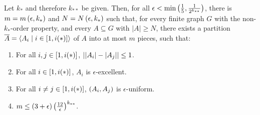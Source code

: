     \theorem[Theorem 5.18]\label{minimal_conditions_for_excellent_partitions}
        Let $k_*$ and therefore $k_{**}$ be given.
        Then, for all $\epsilon < \min \left( \frac{1}{5}, \frac{1}{2^{k_{**}}} \right)$, there is $m = m\left( \epsilon, k_* \right)$
        and $N = N\left( \epsilon, k_* \right)$ such that, for every finite graph $G$ with the non-$k_{*}$-order property, and
        every $A \subseteq G$ with $|A| \geq N$, there exists a partition $\overline{A} = \left< A_i \mid i \in \left[ 1, i(*) \right] \right>$
        of $A$ into at most $m$ pieces, such that:
        \begin{enumerate}
            \item \label{itm:5.18.1} For all $i, j \in \left[ 1, i(*) \right]$, $\left| \left| A_i \right|- \left| A_j \right| \right| \leq 1$.
            \item \label{itm:5.18.2} For all $i \in \left[ 1, i(*) \right]$, $A_i$ is $\epsilon$-excellent.
            \item \label{itm:5.18.3} For all $i \neq j \in \left[ 1, i(*) \right]$, $\left( A_i, A_j \right)$ is $\epsilon$-uniform.
            \item \label{itm:5.18.4} $m \leq \left( 3 + \epsilon \right) \left( \frac{12}{\epsilon} \right)^{k_{**}}$.
        \end{enumerate}
